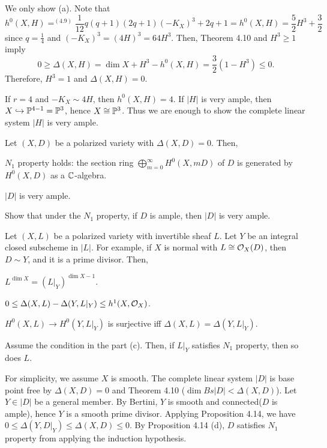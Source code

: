\documentclass{../../small}
\begin{document}
\begin{pf}
We only show (a).
Note that
\[h^0(X,H)=^{(4.9)}\frac1{12}q(q+1)(2q+1)(-K_X)^3+2q+1=h^0(X,H)=\frac52H^3+\frac32\]
since $q=\frac14$ and $(-K_X)^3=(4H)^3=64H^3$.
Then, Theorem 4.10 and $H^3\ge1$ imply
\[0\ge\Delta(X,H)=\dim X+H^3-h^0(X,H)=\frac32(1-H^3)\le0.\]
Therefore, $H^3=1$ and $\Delta(X,H)=0$.
\end{pf}

\begin{rmk}
If $r=4$ and $-K_X\sim4H$, then $h^0(X,H)=4$.
If $|H|$ is very ample, then $X\hookrightarrow\P^{4-1}=\P^3$, hence $X\cong\P^3$.
Thus we are enough to show the complete linear system $|H|$ is very ample.
\end{rmk}

\begin{thm}
Let $(X,D)$ be a polarized variety with $\Delta(X,D)=0$.
Then,
\begin{parts}
\item $N_1$ property holds: the section ring $\bigoplus_{m=0}^\infty H^0(X,mD)$ of $D$ is generated by $H^0(X,D)$ as a $\C$-algebra.
\item $|D|$ is very ample.
\end{parts}
\end{thm}

\begin{exe}
Show that under the $N_1$ property, if $D$ is ample, then $|D|$ is very ample.
\end{exe}

\begin{prop}
Let $(X,L)$ be a polarized variety with invertible sheaf $L$.
Let $Y$ be an integral closed subscheme in $|L|$.
For example, if $X$ is normal with $L\cong\cO_X(D)$, then $D\sim Y$, and it is a prime divisor.
Then,
\begin{parts}
\item $L^{\dim X}=(L|_Y)^{\dim X-1}$.
\item $0\le\Delta(X,L)-\Delta(Y,L|_Y)\le h^1(X,\cO_X)$.
\item $H^0(X,L)\to H^0(Y,L|_Y)$ is surjective iff $\Delta(X,L)=\Delta(Y,L|_Y)$.
\item Assume the condition in the part (c). Then, if $L|_Y$ satisfies $N_1$ property, then so does $L$.
\end{parts}
\end{prop}

\begin{pf}
For simplicity, we assume $X$ is smooth.
The complete linear system $|D|$ is base point free by $\Delta(X,D)=0$ and Theorem 4.10 ($\dim Bs|D|<\Delta(X,D)$).
Let $Y\in|D|$ be a general member.
By Bertini, $Y$ is smooth and connected($D$ is ample), hence $Y$ is a smooth prime divisor.
Applying Proposition 4.14, we have $0\le\Delta(Y,D|_Y)\le\Delta(X,D)\le0$.
By Proposition 4.14 (d), $D$ satisfies $N_1$ property from applying the induction hypothesis.
\end{pf}
\end{document}
